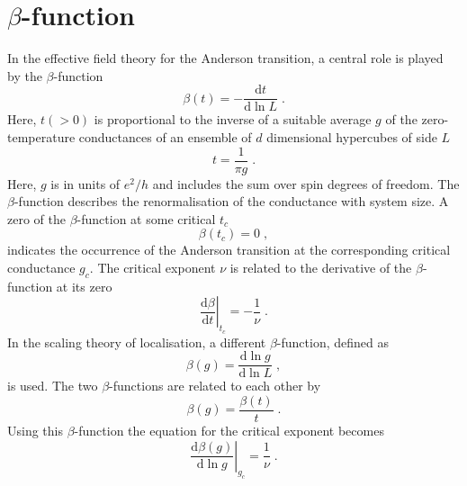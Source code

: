 \documentclass[singlecolumn]{jpsj3}
\begin{document}
\section{$\beta$-function}\label{sec:beta}

In the effective field theory for the Anderson transition, a central role is played by the $\beta$-function
\begin{equation}
  	\beta(t) = - \frac{\mathrm{d} t}{\mathrm{d} \ln L} \;.
\end{equation}
Here, $t(>0)$ is proportional to the inverse of a suitable average $g$ of the zero-temperature conductances of an ensemble of $d$ dimensional hypercubes of side $L$
\begin{equation} \label{eq:def_t}
	t = \frac{1}{\pi g} \;.
\end{equation}
Here, $g$ is in units of $e^2/h$ and includes the sum over spin degrees of freedom.
The $\beta$-function describes the renormalisation of the conductance with system size.
A zero of the $\beta$-function at some critical $t_c$
\begin{equation}\label{eq:def_tc}
	\beta(t_c) = 0 \;,
\end{equation}
indicates the occurrence of the Anderson transition at the corresponding critical conductance $g_c$.
The critical exponent $\nu$ is related to the derivative of the $\beta$-function at its zero
\begin{equation}\label{eq:beta_t_deriv}
  \left.\frac{\mathrm{d} \beta}{\mathrm{d} t} \right|_{t_c} = -\frac{1}{\nu} \;.
\end{equation}
In the scaling theory of localisation\cite{Abrahams79}, a different $\beta$-function, defined as
\begin{equation}
  \beta(g) = \frac{\mathrm{d} \ln g}{\mathrm{d} \ln L} \;,
\end{equation}
is used.
The two $\beta$-functions are related to each other by
\begin{equation}\label{eq:relation_beta}
\beta(g) = \frac{\beta(t)}{t} \;.
\end{equation}
Using this $\beta$-function the equation for the critical exponent becomes
\begin{equation}\label{eq:beta_g_deriv}
	\left. \frac{\mathrm{d} \beta\left(g\right)}{\mathrm{d} \ln g} \right|_{g_c} = \frac{1}{\nu} \;.
\end{equation}
\end{document}
